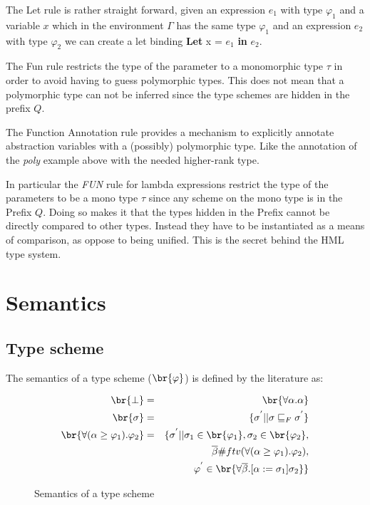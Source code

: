 The Let rule is rather straight forward, given an expression $e_1$ with type $\varphi_1$ and a variable $x$ which in the environment $\Gamma$ has the same type $\varphi_1$ and an expression $e_2$ with type $\varphi_2$ we can create a let binding \textbf{Let} x = $e_1$ \textbf{in} $e_2$.

\begin{prooftree}
\end{prooftree}

The Fun rule restricts the type of the parameter to a monomorphic type $\tau$ in order to avoid having to guess polymorphic types. This does not mean that a polymorphic type can not be inferred since the type schemes are hidden in the prefix $Q$.

\begin{prooftree}
\end{prooftree}

The Function Annotation rule provides a mechanism to explicitly annotate abstraction variables with a (possibly) polymorphic type. Like the annotation of the \textit{poly} example above with the needed higher-rank type.

In particular the \textit{FUN} rule for lambda expressions restrict the type of the parameters to be a mono type $\tau$ since any scheme on the mono type is in the Prefix $Q$. Doing so makes it that the types hidden in the Prefix cannot be directly compared to other types. Instead they have to be instantiated as a means of comparison, as oppose to being unified. This is the secret behind the HML type system.  

\section{Semantics}
\subsection{Type scheme}
The semantics of a type scheme ($\br{\varphi}$) is defined by the literature\cite{HML} as:
\begin{figure}[H]
\begin{eqnarray*}
\br{\bot} & = & \br{\forall\alpha . \alpha} \\
\br{\sigma} & = & \{ \sigma^{'} || \sigma \sqsubseteq_F \sigma^{'} \} \\
\br{\forall(\alpha \geq \varphi_1).\varphi_2} & = & \{ \sigma^{'} || \sigma_1  \in \br{\varphi_1}, \sigma_2 \in \br{\varphi_2}, \\ 
   &\mbox{   }& \mbox{   } \overline{\beta} \# ftv(\forall(\alpha \geq \varphi_1).\varphi_2), \\
   &\mbox{   }& \mbox{   } \varphi^{'} \in \br{\forall\overline{\beta}.\lbrack \alpha := \sigma_1 \rbrack\sigma_2}  \} 
\end{eqnarray*}
\caption{Semantics of a type scheme}
\end{figure}

